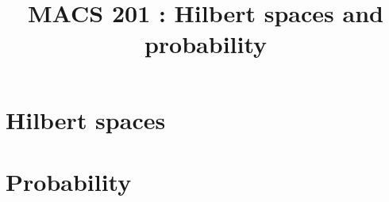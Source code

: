 \documentclass[a4paper,9pt]{article}
\title{\vspace{-1.2cm} MACS 201 : Hilbert spaces and probability}
\date{}
\begin{document}
\maketitle

\vspace{-1.5cm}

\section{Hilbert spaces}

	

\section{Probability}

	
\end{document}
